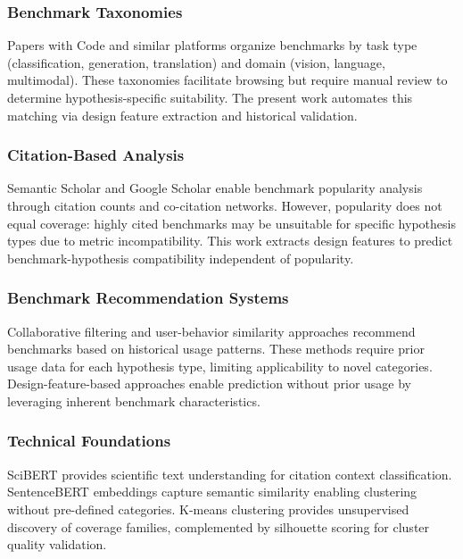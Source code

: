 
\subsubsection{Benchmark Taxonomies}

Papers with Code and similar platforms organize benchmarks by task type (classification, generation, translation) and domain (vision, language, multimodal). These taxonomies facilitate browsing but require manual review to determine hypothesis-specific suitability. The present work automates this matching via design feature extraction and historical validation.

\subsubsection{Citation-Based Analysis}

Semantic Scholar and Google Scholar enable benchmark popularity analysis through citation counts and co-citation networks. However, popularity does not equal coverage: highly cited benchmarks may be unsuitable for specific hypothesis types due to metric incompatibility. This work extracts design features to predict benchmark-hypothesis compatibility independent of popularity.

\subsubsection{Benchmark Recommendation Systems}

Collaborative filtering and user-behavior similarity approaches recommend benchmarks based on historical usage patterns. These methods require prior usage data for each hypothesis type, limiting applicability to novel categories. Design-feature-based approaches enable prediction without prior usage by leveraging inherent benchmark characteristics.

\subsubsection{Technical Foundations}

SciBERT provides scientific text understanding for citation context classification. SentenceBERT embeddings capture semantic similarity enabling clustering without pre-defined categories. K-means clustering provides unsupervised discovery of coverage families, complemented by silhouette scoring for cluster quality validation.
